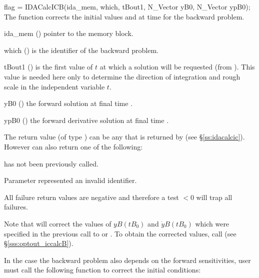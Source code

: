 {
  flag = IDACalcICB(ida\_mem, which, tBout1, N\_Vector yB0, N\_Vector ypB0);
}
{
  The function  corrects the initial values  and  at
  time  for the backward problem.
}
{
  \begin{args}
  \item[ida\_mem] ()
    pointer to the {\idas} memory block.
  \item[which] ()
    is the identifier of the backward problem.
  \item[tBout1] ()
    is the first value of $t$ at which a solution will be requested (from
    ). This value is needed here only to determine the direction of
    integration and rough scale in the independent variable $t$.   
  \item[yB0] ()
    the forward solution at final time .
  \item[ypB0] ()
    the forward derivative solution at final time .
  \end{args}
}
{
  The return value  (of type ) can be any that is returned by 
   (see \S\ref{ss:idacalcic}). However  can also 
  return one of the following:

  \begin{args}
  \item[\Id{IDA\_NO\_ADJ}]
     has not been previously called.
  \item[\id{IDA\_ILL\_INPUT}]
    Parameter  represented an invalid identifier.
  \end{args} 
}
{
  All failure return values are negative and therefore a test  $< 0$
  will trap all  failures.

  Note that  will correct the values of $yB(tB_0)$ and 
  $\dot{y}B(tB_0)$ which were specified in the previous call to  
  or . To obtain the corrected values, call 
   (see \S\ref{sss:optout_iccalcB}).
}

In the case the backward problem also depends on the forward sensitivities, 
user must call the following function to correct the initial conditions:

